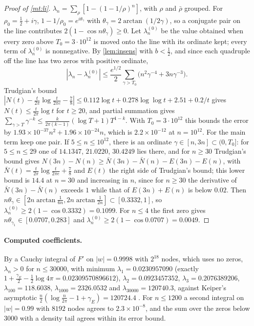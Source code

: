 \documentclass[11pt]{article}
\theoremstyle{definition}\newtheorem{definition}[theorem]{Definition}
\theoremstyle{remark}\newtheorem{remark}[theorem]{Remark}
\begin{document}
\begin{proof}[Proof of \cref{mt:li}]
$\lambda_n=\sum_\rho[1-(1-1/\rho)^n]$, with $\rho$ and $\bar\rho$ grouped. For $\rho_0=\frac12+i\gamma$, $1-1/\rho_0=e^{i\theta_\gamma}$ with $\theta_\gamma=2\arctan(1/2\gamma)$, so a conjugate pair on the line contributes $2(1-\cos n\theta_\gamma)\ge0$. Let $\lambda_n^{(0)}$ be the value obtained when every zero above $T_0=3\cdot10^{12}$ is moved onto the line with its ordinate kept; every term of $\lambda_n^{(0)}$ is nonnegative. By \cref{lem:insens} with $b<\frac12$, and since each quadruple off the line has two zeros with positive ordinate,
\[
|\lambda_n-\lambda_n^{(0)}|\le\frac{e^{1/2}}2\sum_{\gamma>T_0}\bigl(n^2\gamma^{-4}+3n\gamma^{-3}\bigr).
\]
Trudgian's bound $|N(t)-\frac t{2\pi}\log\frac t{2\pi e}-\frac78|\le0.112\log t+0.278\log\log t+2.51+0.2/t$ \cite{Trudgian} gives $N(t)\le\frac t{2\pi}\log t$ for $t\ge20$, and partial summation gives $\sum_{\gamma>T}\gamma^{-k}\le\frac k{2\pi(k-1)}(\log T+1)T^{1-k}$. With $T_0=3\cdot10^{12}$ this bounds the error by $1.93\times10^{-37}n^2+1.96\times10^{-24}n$, which is $2.2\times10^{-12}$ at $n=10^{12}$. For the main term keep one pair. If $5\le n\le10^{12}$, there is an ordinate $\gamma\in[n,3n]\subset(0,T_0]$: for $5\le n\le29$ one of $14.1347$, $21.0220$, $30.4249$ lies there, and for $n\ge30$ Trudgian's bound gives $N(3n)-N(n)\ge\bar N(3n)-\bar N(n)-E(3n)-E(n)$, with $\bar N(t)=\frac t{2\pi}\log\frac t{2\pi e}+\frac78$ and $E(t)$ the right side of Trudgian's bound; this lower bound is $14.4$ at $n=30$ and increasing in $n$, since for $n\ge30$ the derivative of $\bar N(3n)-\bar N(n)$ exceeds $1$ while that of $E(3n)+E(n)$ is below $0.02$. Then $n\theta_\gamma\in[2n\arctan\frac1{6n},2n\arctan\frac1{2n}]\subset[0.3332,1]$, so $\lambda_n^{(0)}\ge2(1-\cos0.3332)=0.1099$. For $n\le4$ the first zero gives $n\theta_{\gamma_1}\in[0.0707,0.283]$ and $\lambda_n^{(0)}\ge2(1-\cos0.0707)=0.0049$.
\end{proof}

\paragraph{Computed coefficients.} By a Cauchy integral of $F'$ on $|w|=0.9998$ with $2^{18}$ nodes, which uses no zeros, $\lambda_n>0$ for $n\le30000$, with minimum $\lambda_1=0.0230957090$ (exactly $1+\frac{\gamma_E}2-\frac12\log4\pi=0.02309570896612$), $\lambda_2=0.0923457352$, $\lambda_3=0.2076389206$, $\lambda_{100}=118.6038$, $\lambda_{1000}=2326.0532$ and $\lambda_{30000}=120740.3$, against Keiper's asymptotic $\frac n2(\log\frac n{2\pi}-1+\gamma_E)=120724.4$ \cite{Keiper}. For $n\le1200$ a second integral on $|w|=0.99$ with $8192$ nodes agrees to $2.3\times10^{-8}$, and the sum over the zeros below $3000$ with a density tail agrees within its error bound.
\end{document}
